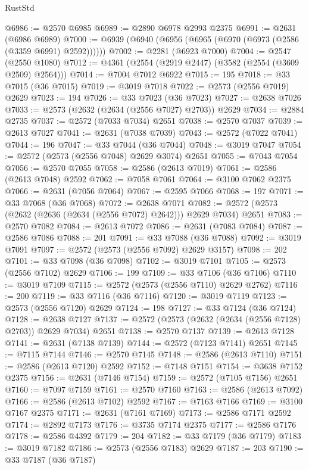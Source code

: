 \begin{lexlean}{RustStd}
\begin{coremodule}
@6986 := @2570 @6985
@6989 := @2890 @6978 @2993 @2375
@6991 := @2631 (@6986 @6989)
@7000 := @6939 (@6940 (@6956 (@6965 (@6970 (@6973 (@2586 (@3359 @6991) @2592))))))
@7002 := @2281 (@6923 @7000)
@7004 := @2547 (@2550 @1080)
@7012 := @4361 (@2554 (@2919 @2447) (@3582 (@2554 (@3609 @2509) @2564)))
@7014 := @7004 @7012 @6922
@7015 := 195
@7018 := @33 @7015 (@36 @7015)
@7019 := @3019 @7018
@7022 := @2573 (@2556 @7019) @2629
@7023 := 194
@7026 := @33 @7023 (@36 @7023)
@7027 := @2638 @7026
@7033 := @2573 (@2632 (@2634 (@2556 @7027) @2703)) @2629
@7034 := @2884 @2735
@7037 := @2572 (@7033 @7034) @2651
@7038 := @2570 @7037
@7039 := @2613 @7027
@7041 := @2631 (@7038 @7039)
@7043 := @2572 (@7022 @7041)
@7044 := 196
@7047 := @33 @7044 (@36 @7044)
@7048 := @3019 @7047
@7054 := @2572 (@2573 (@2556 @7048) @2629 @3074) @2651
@7055 := @7043 @7054
@7056 := @2570 @7055
@7058 := @2586 (@2613 @7019)
@7061 := @2586 (@2613 @7048) @2592
@7062 := @7058 @7061
@7064 := @3100 @7062 @2375
@7066 := @2631 (@7056 @7064)
@7067 := @2595 @7066
@7068 := 197
@7071 := @33 @7068 (@36 @7068)
@7072 := @2638 @7071
@7082 := @2572 (@2573 (@2632 (@2636 (@2634 (@2556 @7072) @2642))) @2629 @7034) @2651
@7083 := @2570 @7082
@7084 := @2613 @7072
@7086 := @2631 (@7083 @7084)
@7087 := @2586 @7086
@7088 := 201
@7091 := @33 @7088 (@36 @7088)
@7092 := @3019 @7091
@7097 := @2572 (@2573 (@2556 @7092) @2629 @3157)
@7098 := 202
@7101 := @33 @7098 (@36 @7098)
@7102 := @3019 @7101
@7105 := @2573 (@2556 @7102) @2629
@7106 := 199
@7109 := @33 @7106 (@36 @7106)
@7110 := @3019 @7109
@7115 := @2572 (@2573 (@2556 @7110) @2629 @2762)
@7116 := 200
@7119 := @33 @7116 (@36 @7116)
@7120 := @3019 @7119
@7123 := @2573 (@2556 @7120) @2629
@7124 := 198
@7127 := @33 @7124 (@36 @7124)
@7128 := @2638 @7127
@7137 := @2572 (@2573 (@2632 (@2634 (@2556 @7128) @2703)) @2629 @7034) @2651
@7138 := @2570 @7137
@7139 := @2613 @7128
@7141 := @2631 (@7138 @7139)
@7144 := @2572 (@7123 @7141) @2651
@7145 := @7115 @7144
@7146 := @2570 @7145
@7148 := @2586 (@2613 @7110)
@7151 := @2586 (@2613 @7120) @2592
@7152 := @7148 @7151
@7154 := @3638 @7152 @2375
@7156 := @2631 (@7146 @7154)
@7159 := @2572 (@7105 @7156) @2651
@7160 := @7097 @7159
@7161 := @2570 @7160
@7163 := @2586 (@2613 @7092)
@7166 := @2586 (@2613 @7102) @2592
@7167 := @7163 @7166
@7169 := @3100 @7167 @2375
@7171 := @2631 (@7161 @7169)
@7173 := @2586 @7171 @2592
@7174 := @2892 @7173
@7176 := @3735 @7174 @2375
@7177 := @2586 @7176
@7178 := @2586 @4392
@7179 := 204
@7182 := @33 @7179 (@36 @7179)
@7183 := @3019 @7182
@7186 := @2573 (@2556 @7183) @2629
@7187 := 203
@7190 := @33 @7187 (@36 @7187)

\end{coremodule}
\end{lexlean}
